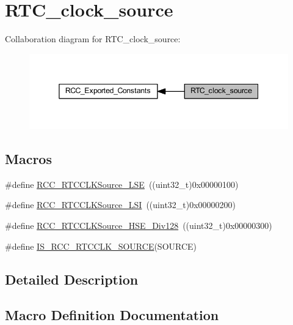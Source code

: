 \hypertarget{group___r_t_c__clock__source}{}\section{R\+T\+C\+\_\+clock\+\_\+source}
\label{group___r_t_c__clock__source}
Collaboration diagram for R\+T\+C\+\_\+clock\+\_\+source\+:
\nopagebreak
\begin{figure}[H]
\begin{center}
\leavevmode
\includegraphics[width=345pt]{group___r_t_c__clock__source}
\end{center}
\end{figure}
\subsection*{Macros}
\begin{DoxyCompactItemize}
\item 
\#define \hyperlink{group___r_t_c__clock__source_ga18c0c40ff4289148c9fa44c6848d5552}{R\+C\+C\+\_\+\+R\+T\+C\+C\+L\+K\+Source\+\_\+\+L\+SE}~((uint32\+\_\+t)0x00000100)
\item 
\#define \hyperlink{group___r_t_c__clock__source_ga7758c87e4584bfa76cb99c726b7162c3}{R\+C\+C\+\_\+\+R\+T\+C\+C\+L\+K\+Source\+\_\+\+L\+SI}~((uint32\+\_\+t)0x00000200)
\item 
\#define \hyperlink{group___r_t_c__clock__source_gada0bedcd0afa5104ec0ef398d1ac2778}{R\+C\+C\+\_\+\+R\+T\+C\+C\+L\+K\+Source\+\_\+\+H\+S\+E\+\_\+\+Div128}~((uint32\+\_\+t)0x00000300)
\item 
\#define \hyperlink{group___r_t_c__clock__source_gae76a0340b02b5342e756fa0d2112ebf5}{I\+S\+\_\+\+R\+C\+C\+\_\+\+R\+T\+C\+C\+L\+K\+\_\+\+S\+O\+U\+R\+CE}(S\+O\+U\+R\+CE)
\end{DoxyCompactItemize}


\subsection{Detailed Description}


\subsection{Macro Definition Documentation}
\mbox{\label{group___r_t_c__clock__source_gae76a0340b02b5342e756fa0d2112ebf5}} 
